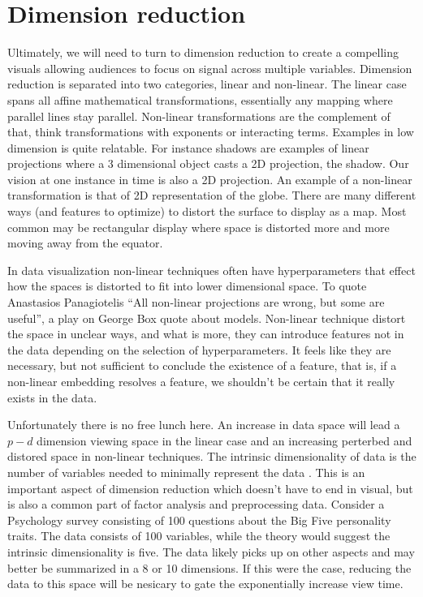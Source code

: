 \documentclass{template/monashthesis}
\begin{document}
\hypertarget{dimension-reduction}{%
\section{Dimension reduction}\label{dimension-reduction}}

Ultimately, we will need to turn to dimension reduction to create a compelling visuals allowing audiences to focus on signal across multiple variables. Dimension reduction is separated into two categories, linear and non-linear. The linear case spans all affine mathematical transformations, essentially any mapping where parallel lines stay parallel. Non-linear transformations are the complement of that, think transformations with exponents or interacting terms. Examples in low dimension is quite relatable. For instance shadows are examples of linear projections where a 3 dimensional object casts a 2D projection, the shadow. Our vision at one instance in time is also a 2D projection. An example of a non-linear transformation is that of 2D representation of the globe. There are many different ways (and features to optimize) to distort the surface to display as a map. Most common may be rectangular display where space is distorted more and more moving away from the equator.

In data visualization non-linear techniques often have hyperparameters that effect how the spaces is distorted to fit into lower dimensional space. To quote Anastasios Panagiotelis ``All non-linear projections are wrong, but some are useful'', a play on George Box quote about models. Non-linear technique distort the space in unclear ways, and what is more, they can introduce features not in the data depending on the selection of hyperparameters. It feels like they are necessary, but not sufficient to conclude the existence of a feature, that is, if a non-linear embedding resolves a feature, we shouldn't be certain that it really exists in the data.

Unfortunately there is no free lunch here. An increase in data space will lead a \(p-d\) dimension viewing space in the linear case and an increasing perterbed and distored space in non-linear techniques. The intrinsic dimensionality of data is the number of variables needed to minimally represent the data \autocite{grinstein_high-dimensional_2002}. This is an important aspect of dimension reduction which doesn't have to end in visual, but is also a common part of factor analysis and preprocessing data. Consider a Psychology survey consisting of 100 questions about the Big Five personality traits. The data consists of 100 variables, while the theory would suggest the intrinsic dimensionality is five. The data likely picks up on other aspects and may better be summarized in a 8 or 10 dimensions. If this were the case, reducing the data to this space will be nesicary to gate the exponentially increase view time.
\end{document}
